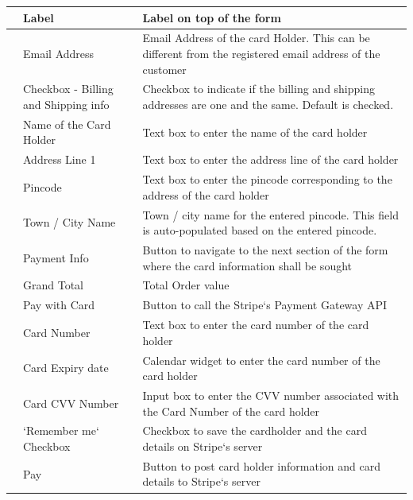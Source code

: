 \documentclass[hidelinks,a4paper,12pt]{article}
\begin{document}
\begin{center}
{\begin{tabularx}{\textwidth}{ | >{\ttfamily\raggedright\arraybackslash} s 
	| >{\ttfamily\raggedright\arraybackslash} t 
	| >{\ttfamily\raggedright\arraybackslash} t | }
	 & Label & Label on top of the form \\
	 & Email Address & Email Address of the card Holder. This can be different from the registered email address of the customer \\
	 & Checkbox - Billing and Shipping info & Checkbox to indicate if the billing and shipping addresses are one and the same. Default is checked. \\
	 & Name of the Card Holder & Text box to enter the name of the card holder  \\
	 & Address Line 1 & Text box to enter the address line of the card holder  \\
	 & Pincode & Text box to enter the pincode corresponding to the address of the card holder  \\
	 & Town / City Name & Town / city name for the entered pincode. This field is auto-populated based on the entered pincode.  \\
	 & Payment Info & Button to navigate to the next section of the form where the card information shall be sought \\
	 & Grand Total & Total Order value  \\
	 & Pay with Card & Button to call the Stripe`s \Gls{Payment Gateway} \Gls{API}   \\
	 & Card Number & Text box to enter the card number of the card holder\\
	 & Card Expiry date & Calendar widget to enter the card number of the card holder\\
	 & Card CVV Number & Input box to enter the CVV number associated with the Card Number of the card holder\\
	 & `Remember me` Checkbox & Checkbox to save the cardholder and the card details on Stripe`s server\\
	 & Pay & Button to post card holder information and card details to Stripe`s server\\
	\hline										
	\end{tabularx}
	}
\end{center}
\end{document}
